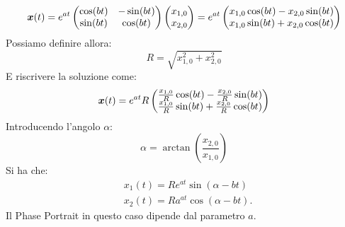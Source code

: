 \begin{exmp}[3]
        \[
	    \boldsymbol{x} (t) = e^{at} \begin{pmatrix} \cos (bt) & -\sin (bt) \\ \sin (bt) & \cos (bt) \end{pmatrix} \begin{pmatrix} x_{1,0} \\ x_{2, 0} \end{pmatrix} = e^{at}\begin{pmatrix} x_{1, 0}\cos (bt) - x_{2, 0}\sin (bt) \\ x_{1, 0}\sin (bt) + x_{2, 0}\cos (bt) \end{pmatrix} 
    \] 
    Possiamo definire allora:
    \[
        R = \sqrt{x_{1,0}^2 + x_{2, 0}^2} 
    \] 
    E riscrivere la soluzione come:
    \[
	\boldsymbol{x} (t) = e^{at}R \begin{pmatrix} \frac{x_{1, 0}}{R}\cos(bt) - \frac{x_{2, 0}}{R}\sin (bt) \\ \frac{x_{1, 0}}{R}\sin (bt) + \frac{x_{2, 0}}{R}\cos (bt) \end{pmatrix} 
    \] 
    Introducendo l'angolo $\alpha$:
    \[
	\alpha  = \arctan\left(\frac{x_{2, 0}}{x_{1, 0}}\right)
    \] 
    Si ha che:
    \[\begin{aligned}
	& x_{1}(t) = R e^{at}\sin (\alpha-bt)\\
	& x_2(t) = R a^{at}\cos (\alpha-bt)
    .\end{aligned}\]
    Il Phase Portrait in questo caso dipende dal parametro $a$.
\end{exmp}
\noindent
